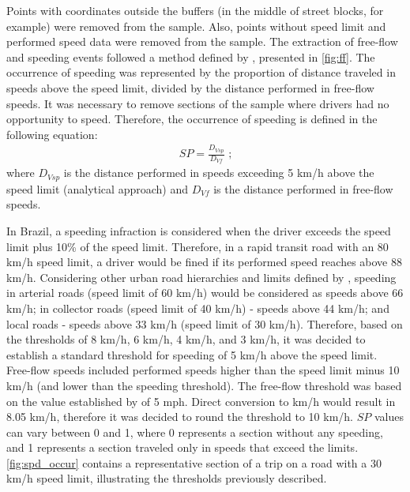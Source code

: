 Points with coordinates outside the buffers (in the middle of street blocks, for example) were removed from the sample. Also, points without speed limit and performed speed data were removed from the sample. The extraction of free-flow and speeding events followed a method defined by \textcite{Richard2013}, presented in \autoref{fig:ff}. The occurrence of speeding was represented by the proportion of distance traveled in speeds above the speed limit, divided by the distance performed in free-flow speeds. It was necessary to remove sections of the sample where drivers had no opportunity to speed. Therefore, the occurrence of speeding is defined in the following equation: \begin{align}
    SP = \frac{D_{Vsp}}{D_{Vf}} \mbox{ ;} 
    \label{eq:sp}
\end{align} where $D_{Vsp}$ is the distance performed in speeds exceeding 5 km/h above the speed limit (analytical approach) and $D_{Vf}$ is the distance performed in free-flow speeds. 

In Brazil, a speeding infraction is considered when the driver exceeds the speed limit plus 10\% of the speed limit. Therefore, in a rapid transit road with an 80 km/h speed limit, a driver would be fined if its performed speed reaches above 88 km/h. Considering other urban road hierarchies and limits defined by \textcite{Brasil1997}, speeding in arterial roads (speed limit of 60 km/h) would be considered as speeds above 66 km/h; in collector roads (speed limit of 40 km/h) - speeds above 44 km/h; and local roads - speeds above 33 km/h (speed limit of 30 km/h). Therefore, based on the thresholds of 8 km/h, 6 km/h, 4 km/h, and 3 km/h, it was decided to establish a standard threshold for speeding of 5 km/h above the speed limit. Free-flow speeds included performed speeds higher than the speed limit minus 10 km/h (and lower than the speeding threshold). The free-flow threshold was based on the value established by \textcite{Richard2017} of 5 mph. Direct conversion to km/h would result in 8.05 km/h, therefore it was decided to round the threshold to 10 km/h. $SP$ values can vary between 0 and 1, where 0 represents a section without any speeding, and 1 represents a section traveled only in speeds that exceed the limits. \autoref{fig:spd_occur} contains a representative section of a trip on a road with a 30 km/h speed limit, illustrating the thresholds previously described.   


